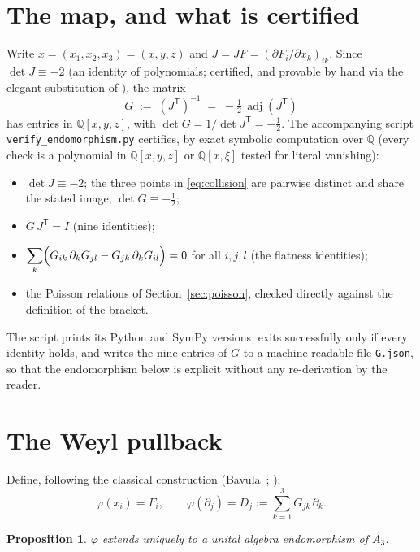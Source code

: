 \documentclass[11pt]{article}
\newtheorem{proposition}[theorem]{Proposition}
\theoremstyle{remark}
\newcommand{\Q}{\mathbb{Q}}
\newcommand{\A}{A_3}
\newcommand{\adj}{\operatorname{adj}}
\begin{document}
\section{The map, and what is certified}\label{sec:certified}

Write $x=(x_1,x_2,x_3)=(x,y,z)$ and $J = JF = (\partial F_i/\partial
x_k)_{ik}$. Since $\det J\equiv-2$ (an identity of polynomials; certified,
and provable by hand via the elegant substitution of \cite[Lem.~1]{OP2026}),
the matrix
\[
G \;:=\; (J^{\mathsf T})^{-1} \;=\; -\tfrac12\,\adj(J^{\mathsf T})
\]
has entries in $\Q[x,y,z]$, with $\det G = 1/\det J^{\mathsf T} = -\tfrac12$.
The accompanying script \texttt{verify\_endomorphism.py} certifies, by exact
symbolic computation over $\Q$ (every check is a polynomial in
$\Q[x,y,z]$ or $\Q[x,\xi]$ tested for literal vanishing):
\begin{itemize}
\item[(C0)] $\det J \equiv -2$; the three points in \eqref{eq:collision}
are pairwise distinct and share the stated image; $\det G \equiv -\tfrac12$;
\item[(R1)] $G\,J^{\mathsf T} = I$ \quad (nine identities);
\item[(R2)] $\displaystyle\sum_{k}\Bigl(G_{ik}\,\partial_k G_{jl} -
G_{jk}\,\partial_k G_{il}\Bigr) = 0$ for all $i,j,l$ \quad (the flatness
identities);
\item[(P1--P3)] the Poisson relations of Section~\ref{sec:poisson}, checked
directly against the definition of the bracket.
\end{itemize}
The script prints its Python and SymPy versions, exits successfully only if
every identity holds, and writes the nine entries of $G$ to a
machine-readable file \texttt{G.json}, so that the endomorphism below is
explicit without any re-derivation by the reader.

\section{The Weyl pullback}\label{sec:weyl}

Define, following the classical construction (Bavula~\cite{Bavula2024};
\cite[\S3]{OP2026}):
\[
\varphi(x_i) = F_i,\qquad
\varphi(\partial_j) = D_j := \sum_{k=1}^{3} G_{jk}\,\partial_k .
\]

\begin{proposition}\label{prop:welldef}
$\varphi$ extends uniquely to a unital algebra endomorphism of $\A$.
\end{proposition}
\end{document}
